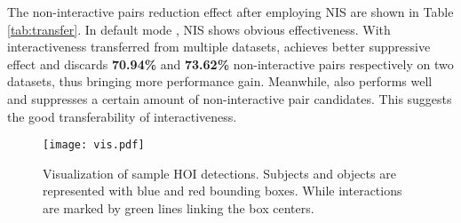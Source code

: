 \documentclass[10pt,twocolumn,letterpaper]{article}
\begin{document}
\begin{table}
\centering
{}
\caption{Results comparison on HICO-DET~\cite{hicodet}.  indicates the default mode, and  means the transfer learning model.}
\label{tab:hico-det}
\vspace{-0.5cm}
\end{table}

 The non-interactive pairs reduction effect after employing NIS are shown in Table \ref{tab:transfer}.
In default mode , NIS shows obvious effectiveness. 
With interactiveness transferred from multiple datasets, 
achieves better suppressive effect and discards 
\textbf{70.94\%} and \textbf{73.62\%} 
non-interactive pairs respectively on two datasets, thus bringing more performance gain.
Meanwhile,  also performs well and suppresses a certain amount of non-interactive pair candidates. This suggests the good transferability of interactiveness.
\begin{figure}[!ht]
	\begin{center}
		\texttt{[image: vis.pdf]}
	\end{center}
	\caption{Visualization of sample HOI detections. Subjects and objects are represented with blue and red bounding boxes. While interactions are marked by green lines linking the box centers.}
	\label{Figure:vis}
	\vspace{-0.3cm}
\end{figure}
\end{document}
